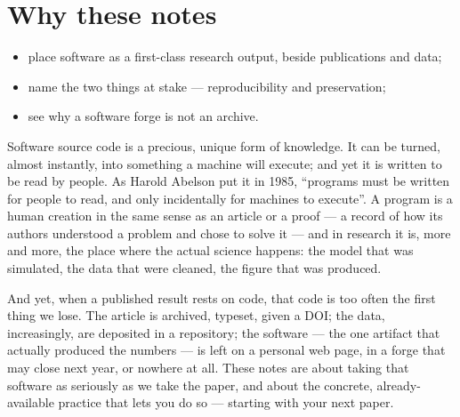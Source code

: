 \chapter{Why these notes}
\label{ch:why}


\begin{objectives}\small
\begin{itemize}[nosep,leftmargin=*]
  \item place software as a first-class research output, beside publications and data;
  \item name the two things at stake --- reproducibility and preservation;
  \item see why a software forge is not an archive.
\end{itemize}
\end{objectives}

Software source code is a precious, unique form of knowledge. It can be turned, almost
instantly, into something a machine will execute; and yet it is written to be read by people.
As Harold Abelson put it in 1985, \enquote{programs must be written for people to read, and
only incidentally for machines to execute}. A program is a human creation in the same sense as
an article or a proof --- a record of how its authors understood a problem and chose to solve
it --- and in research it is, more and more, the place where the actual science happens: the
model that was simulated, the data that were cleaned, the figure that was produced.


And yet, when a published result rests on code, that code is too often the first thing we lose.
The article is archived, typeset, given a DOI; the data, increasingly, are deposited in a
repository; the software --- the one artifact that actually produced the numbers --- is left on
a personal web page, in a forge that may close next year, or nowhere at all. These notes are about
taking that software as seriously as we take the paper, and about the concrete,
already-available practice that lets you do so --- starting with your next paper.

